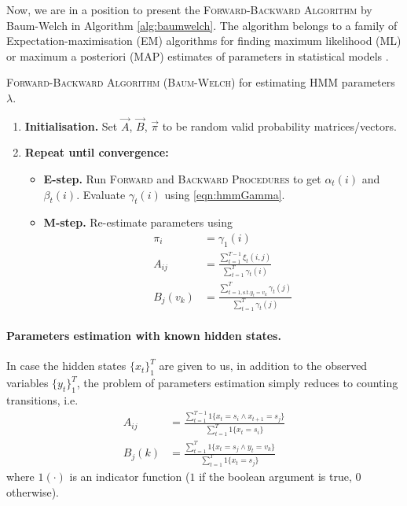 Now, we are in a position to present the \textsc{Forward-Backward Algorithm} by Baum-Welch in Algorithm \ref{alg:baumwelch}. The algorithm belongs to a family of Expectation-maximisation (EM) algorithms for finding maximum likelihood (ML) or maximum a posteriori (MAP) estimates of parameters in statistical models \cite{wiki:EM}.
\begin{algorithm}
	\caption{\textsc{Forward-Backward Algorithm (Baum-Welch)} for estimating HMM parameters $\lambda$.}
	\label{alg:baumwelch}
	\begin{enumerate}
		\item
			\textbf{Initialisation.}
			Set $\vec A$, $\vec B$, $\vec \pi$ to be random valid probability matrices/vectors.
		\item
			\textbf{Repeat until convergence:}
			\begin{itemize}
				\item \textbf{E-step.} Run \textsc{Forward} and \textsc{Backward Procedures} to get $\alpha_t(i)$ and $\beta_t(i)$. Evaluate $\gamma_t(i)$ using \eqref{eqn:hmmGamma}.
				\item \textbf{M-step.} Re-estimate parameters using
				\begin{align*}
					\pi_i & = \gamma_1(i) \\
					A_{ij} & = \frac{\sum_{t = 1}^{T - 1} \xi_t(i, j)}{\sum_{t = 1}^T \gamma_t(i)} \\
					B_j(v_k) & = \frac{\sum_{t = 1, \text{s.t.} y_t = v_k}^T \gamma_t(j)}{\sum_{t = 1}^T \gamma_t(j)}
				\end{align*}
			\end{itemize}
	\end{enumerate}
\end{algorithm}

\paragraph{Parameters estimation with known hidden states.} In case the hidden states $\{x_t\}_1^T$ are given to us, in addition to the observed variables $\{y_t\}_1^T$, the problem of parameters estimation simply reduces to counting transitions, i.e.
	\begin{align}
		A_{ij} & = \frac{\sum_{t = 1}^{T - 1} 1\{x_t = s_i \land x_{t + 1} = s_j\}}{\sum_{t = 1}^{T} 1\{x_t = s_i\}} \\
		B_j(k) & = \frac{\sum_{t = 1}^T 1\{x_t = s_j \land y_t = v_k\}}{\sum_{t = 1}^{T} 1\{x_t = s_j\}}
	\end{align}
where $1(\cdot)$ is an indicator function ($1$ if the boolean argument is true, $0$ otherwise).

